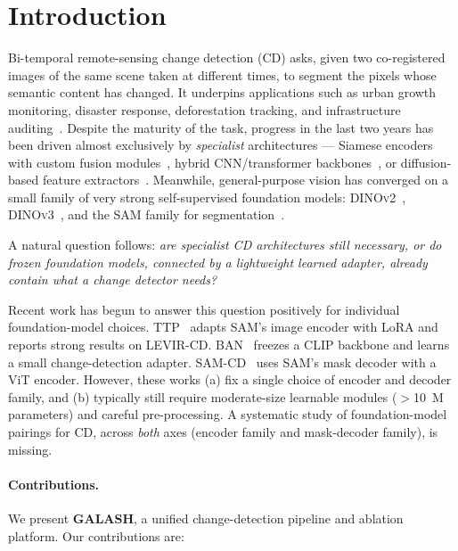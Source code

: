 \section{Introduction}
\label{sec:intro}

Bi-temporal remote-sensing change detection (CD) asks, given two co-registered
images of the same scene taken at different times, to segment the pixels whose
semantic content has changed. It underpins applications such as urban growth
monitoring, disaster response, deforestation tracking, and infrastructure
auditing~\citep{daudt2018fully,chen2020spatial}. Despite the maturity of the
task, progress in the last two years has been driven almost exclusively by
\emph{specialist} architectures --- Siamese encoders with custom fusion
modules~\citep{fang2021snunet,chen2021remote}, hybrid CNN/transformer
backbones~\citep{bandara2022changeformer,zheng2022changestar}, or diffusion-based
feature extractors~\citep{bandara2024ddpmcd}. Meanwhile, general-purpose vision
has converged on a small family of very strong self-supervised foundation
models: \textsc{DINOv2}~\citep{oquab2023dinov2}, \textsc{DINOv3}~\citep{simeoni2025dinov3},
and the \textsc{SAM} family for segmentation~\citep{kirillov2023segment,ravi2024sam2}.

A natural question follows: \emph{are specialist CD architectures still necessary,
or do frozen foundation models, connected by a lightweight learned adapter,
already contain what a change detector needs?}

Recent work has begun to answer this question positively for individual
foundation-model choices. TTP~\citep{chen2024ttp} adapts \textsc{SAM}'s image
encoder with LoRA and reports strong results on LEVIR-CD.
BAN~\citep{li2024ban} freezes a CLIP backbone and learns a small
change-detection adapter. SAM-CD~\citep{dingsamcd} uses SAM's mask decoder
with a ViT encoder. However, these works (a) fix a single choice of encoder and
decoder family, and (b) typically still require moderate-size learnable
modules ($>$10~M parameters) and careful pre-processing. A systematic study of
foundation-model pairings for CD, across \emph{both} axes (encoder family and
mask-decoder family), is missing.

\paragraph{Contributions.} We present \textbf{GALASH}, a unified
change-detection pipeline and ablation platform. Our contributions are:

